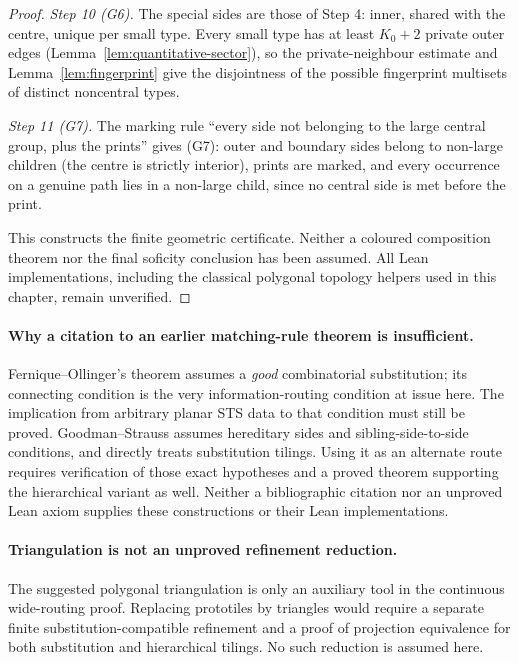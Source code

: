 \documentclass[11pt,a4paper]{article}
\theoremstyle{remark}
\begin{document}
\begin{proof}
\emph{Step 10 (G6).}  The special sides are those of Step 4: inner, shared
with the centre, unique per small type.  Every small type has at least
$K_0+2$ private outer edges (Lemma~\ref{lem:quantitative-sector}), so the
private-neighbour estimate and Lemma~\ref{lem:fingerprint} give the
disjointness of the possible fingerprint multisets of distinct noncentral
types.

\emph{Step 11 (G7).}  The marking rule ``every side not belonging to the large
central group, plus the prints'' gives (G7): outer and boundary sides belong
to non-large children (the centre is strictly interior), prints are marked,
and every occurrence on a genuine path lies in a non-large child, since no
central side is met before the print.

This constructs the finite geometric certificate.  Neither a coloured
composition theorem nor the final soficity conclusion has been assumed.
All Lean implementations, including the classical polygonal topology
helpers used in this chapter, remain unverified.
\end{proof}

\paragraph{Why a citation to an earlier matching-rule theorem is insufficient.}
Fernique--Ollinger's theorem assumes a \emph{good} combinatorial
substitution; its connecting condition is the very information-routing
condition at issue here.  The implication from arbitrary planar STS data
to that condition must still be proved.  Goodman--Strauss assumes
hereditary sides and sibling-side-to-side conditions, and directly treats
substitution tilings.  Using it as an alternate route requires verification
of those exact hypotheses and a proved theorem supporting the hierarchical
variant as well.  Neither a bibliographic citation nor an unproved Lean
axiom supplies these constructions or their Lean implementations.

\paragraph{Triangulation is not an unproved refinement reduction.}
The suggested polygonal triangulation is only an auxiliary tool in the
continuous wide-routing proof.  Replacing prototiles by triangles would
require a separate finite substitution-compatible refinement and a proof
of projection equivalence for both substitution and hierarchical tilings.
No such reduction is assumed here.
\end{document}
